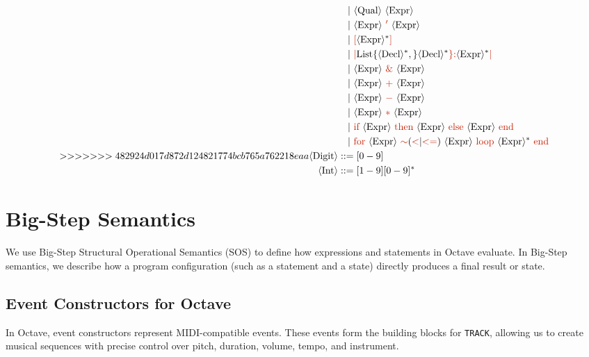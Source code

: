 \documentclass[letterpaper,12pt]{article}
\begin{document}
\begin{align*}
    &\quad | \ \term{Qual} \ \term{Expr} \\
    &\quad | \ \term{Expr} \ \nt{'} \ \term{Expr} \\
    &\quad | \ \nt{[} \term{Expr}^* \nt{]} \\
    &\quad | \ \nt{|} \text{List\{} \term{Decl}^*, \text{\}} \term{Decl}^* \nt{\rbrace} \nt{:} \term{Expr}^* \nt{|} \\
    &\quad | \ \term{Expr} \ \nt{\&} \ \term{Expr} \\
    &\quad | \ \term{Expr} \ \nt{+} \ \term{Expr} \\
    &\quad | \ \term{Expr} \ \nt{-} \ \term{Expr} \\
    &\quad | \ \term{Expr} \ \nt{*} \ \term{Expr} \\
    &\quad | \ \ntext{\text{if}}\  \term{Expr} \ \ntext{then}\ \term{Expr} \ \ntext{else}\ \term{Expr} \ \ntext{end} \\
    &\quad | \ \textcolor{syntax_color}{\text{for}}\  \term{Expr} \ \textcolor{syntax_color}{\sim}{(\nt{<}|\nt{<=})}\ \term{Expr} \ \textcolor{syntax_color}{\text{loop}}\ \term{Expr}^* \ \ntext{end} \\
>>>>>>> 482924d017d872d124821774bcb765a762218eaa
   \term{Digit} &::= {[0-9]} \\
    \term{Int} &::= {[1-9][0-9]^*}
\end{align*}


\section{Big-Step Semantics}

We use Big-Step Structural Operational Semantics (SOS) to define how expressions 
and statements in Octave evaluate. In Big-Step semantics, we describe how a program configuration (such as a statement and a state) directly produces a final result or state. 

\subsection{Event Constructors for Octave} \label{event constructor}

In Octave, event constructors represent MIDI-compatible events. These events form the building blocks for \texttt{TRACK}, allowing us to create musical sequences with precise control over pitch, duration, volume, tempo, and instrument.
\end{document}
